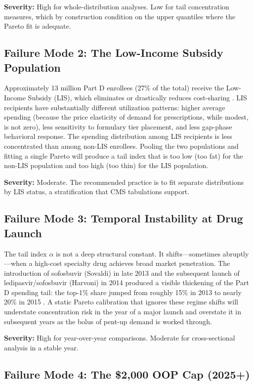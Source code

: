 \documentclass[12pt,letterpaper]{article}
\begin{document}
\textbf{Severity:} High for whole-distribution analyses. Low for tail
concentration measures, which by construction condition on the upper
quantiles where the Pareto fit is adequate.

\subsection{Failure Mode 2: The Low-Income Subsidy Population}

Approximately 13 million Part D enrollees (27\% of the total) receive the
Low-Income Subsidy (LIS), which eliminates or drastically reduces
cost-sharing \citep{CMS2023}. LIS recipients have substantially different
utilization patterns: higher average spending (because the price elasticity of
demand for prescriptions, while modest, is not zero), less sensitivity to
formulary tier placement, and less gap-phase behavioral response. The
spending distribution among LIS recipients is less concentrated than among
non-LIS enrollees. Pooling the two populations and fitting a single Pareto
will produce a tail index that is too low (too fat) for the non-LIS
population and too high (too thin) for the LIS population.

\textbf{Severity:} Moderate. The recommended practice is to fit separate
distributions by LIS status, a stratification that CMS tabulations support.

\subsection{Failure Mode 3: Temporal Instability at Drug Launch}

The tail index $\alpha$ is not a deep structural constant. It shifts---sometimes
abruptly---when a high-cost specialty drug achieves broad market penetration.
The introduction of sofosbuvir (Sovaldi) in late 2013 and the subsequent
launch of ledipasvir/sofosbuvir (Harvoni) in 2014 produced a visible
thickening of the Part D spending tail: the top-1\% share jumped from roughly
15\% in 2013 to nearly 20\% in 2015 \citep{CBO2015}. A static Pareto
calibration that ignores these regime shifts will understate concentration
risk in the year of a major launch and overstate it in subsequent years as
the bolus of pent-up demand is worked through.

\textbf{Severity:} High for year-over-year comparisons. Moderate for
cross-sectional analysis in a stable year.

\subsection{Failure Mode 4: The \$2,000 OOP Cap (2025+)}
\end{document}
